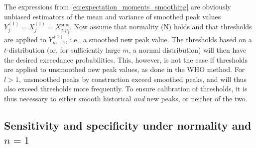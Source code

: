 \documentclass[12pt]{article}
\begin{document}
The expressions from \eqref{eq:expectation_moments_smoothing} are obviously unbiased estimators of the mean and variance of smoothed peak values  $Y_j^{(1)} =  X_j^{(1)} = X^{\text{smo}}_{j, p_j}$. Now assume that normality (N) holds and that thresholds are applied to $Y_{m + 1}^{(1)}$, i.e., a smoothed new peak value. The thresholds based on a $t$-distribution (or, for sufficiently large $m$, a normal distribution) will then have the desired exceedance probabilities. This, however, is not the case if thresholds are applied to unsmoothed new peak values, as done in the WHO method. For $l > 1$, unsmoothed peaks by construction exceed smoothed peaks, and will thus also exceed thresholds more frequently. To ensure calibration of thresholds, it is thus necessary to either smooth historical \textit{and} new peaks, or neither of the two.



\subsection{Sensitivity and specificity under normality and $n = 1$}
\label{subsec:theory_sensitivity}
\end{document}
